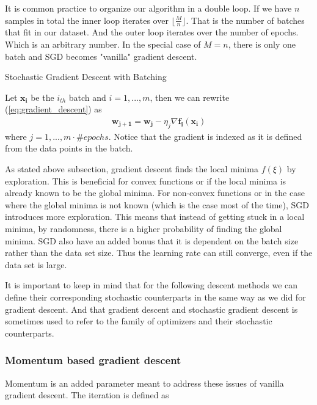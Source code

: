 \documentclass{article}
\theoremstyle{definition}
\begin{document}
It is common practice to organize our algorithm in a double loop. If we have $n$ samples in total the inner loop iterates over $\lfloor\frac{M}{n} \rfloor$. That is the number of batches that fit in our dataset. And the outer loop iterates over the number of epochs. Which is an arbitrary number. In the special case of $M = n$, there is only one batch and SGD becomes "vanilla" gradient descent. 

\newpage

\begin{algorithm}[hbt!]
\caption{Stochastic Gradient Descent with Batching}\label{alg:SGD}
\end{algorithm}
 
Let $\mathbf{x_i}$ be the $i_{th}$ batch and $i=1,...,m$, then we can rewrite (\ref{eq:gradient_descent}) as
\begin{align*}
        \mathbf{w_{j+1}} = \mathbf{w_j} - \eta_j\nabla\mathbf{f_i(x_i)}
\end{align*}
where $j=1,...,m \cdot \#epochs$. Notice that the gradient is indexed as it is defined from the data points in the batch.

As stated above subsection, gradient descent finds the local minima $f(\xi)$ by exploration. This is beneficial for convex functions or if the local minima is already known to be the global minima. For non-convex functions or in the case where the global minima is not known (which is the case most of the time), SGD introduces more exploration. This means that instead of getting stuck in a local minima, by randomness, there is a higher probability of finding the global minima. SGD also have an added bonus that it is dependent on the batch size rather than the data set size. Thus the learning rate can still converge, even if the data set is large.

It is important to keep in mind that for the following descent methods we can define their corresponding stochastic counterparts in the same way as we did for gradient descent. And  that gradient descent and stochastic gradient descent is sometimes used to refer to the family of optimizers and their stochastic counterparts.

\subsubsection{Momentum based gradient descent}
Momentum is an added parameter meant to address these issues of vanilla gradient descent. The iteration is defined as
\end{document}
